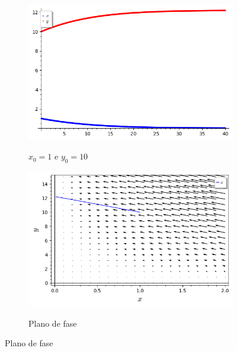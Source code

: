 \begin{figure}[H]
    \centering
    \begin{subfigure}{0.4\textwidth}
        \includegraphics[scale=0.48]{figuras/LV_11.png}
        \label{fig:LV_11}
        \caption{$x_0 = 1$ e $y_0 = 10$}
    \end{subfigure}
    \begin{subfigure}{0.4\textwidth}
        \includegraphics[scale=0.48]{figuras/LV_12.png}
        \label{fig:LV_12}
        \caption{Plano de fase}
    \end{subfigure}
\end{figure}



